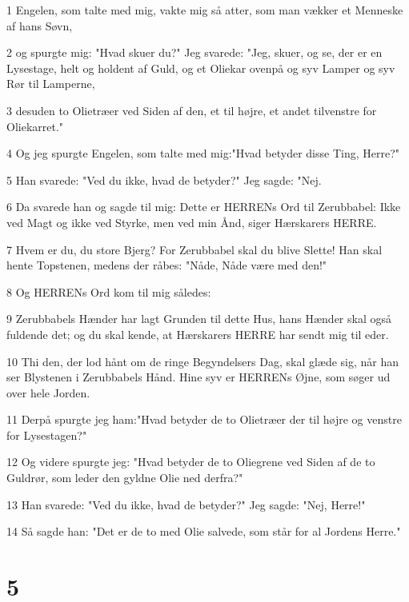 \par 1 Engelen, som talte med mig, vakte mig så atter, som man vækker et Menneske af hans Søvn,
\par 2 og spurgte mig: "Hvad skuer du?" Jeg svarede: "Jeg, skuer, og se, der er en Lysestage, helt og holdent af Guld, og et Oliekar ovenpå og syv Lamper og syv Rør til Lamperne,
\par 3 desuden to Olietræer ved Siden af den, et til højre, et andet tilvenstre for Oliekarret."
\par 4 Og jeg spurgte Engelen, som talte med mig:"Hvad betyder disse Ting, Herre?"
\par 5 Han svarede: "Ved du ikke, hvad de betyder?" Jeg sagde: "Nej.
\par 6 Da svarede han og sagde til mig: Dette er HERRENs Ord til Zerubbabel: Ikke ved Magt og ikke ved Styrke, men ved min Ånd, siger Hærskarers HERRE.
\par 7 Hvem er du, du store Bjerg? For Zerubbabel skal du blive Slette! Han skal hente Topstenen, medens der råbes: "Nåde, Nåde være med den!"
\par 8 Og HERRENs Ord kom til mig således:
\par 9 Zerubbabels Hænder har lagt Grunden til dette Hus, hans Hænder skal også fuldende det; og du skal kende, at Hærskarers HERRE har sendt mig til eder.
\par 10 Thi den, der lod hånt om de ringe Begyndelsers Dag, skal glæde sig, når han ser Blystenen i Zerubbabels Hånd. Hine syv er HERRENs Øjne, som søger ud over hele Jorden.
\par 11 Derpå spurgte jeg ham:"Hvad betyder de to Olietræer der til højre og venstre for Lysestagen?"
\par 12 Og videre spurgte jeg: "Hvad betyder de to Oliegrene ved Siden af de to Guldrør, som leder den gyldne Olie ned derfra?"
\par 13 Han svarede: "Ved du ikke, hvad de betyder?" Jeg sagde: "Nej, Herre!"
\par 14 Så sagde han: "Det er de to med Olie salvede, som står for al Jordens Herre."

\chapter{5}


